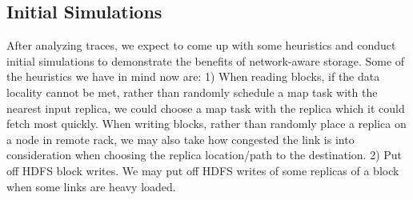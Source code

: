 \subsection{\bf Initial Simulations}
After analyzing traces, we expect to come up with some heuristics and conduct initial simulations to demonstrate the benefits of network-aware storage. Some of the heuristics we have in mind now are:
1) When reading blocks, if the data locality cannot be met, rather than randomly schedule a map task with the nearest input replica, we could choose a map task with the replica which it could fetch most quickly. When writing blocks, rather than randomly place a replica on a node in remote rack, we may also take how congested the link is into consideration when choosing the replica location/path to the destination.
2) Put off HDFS block writes. We may put off HDFS writes of some replicas of a block when some links are heavy loaded.


